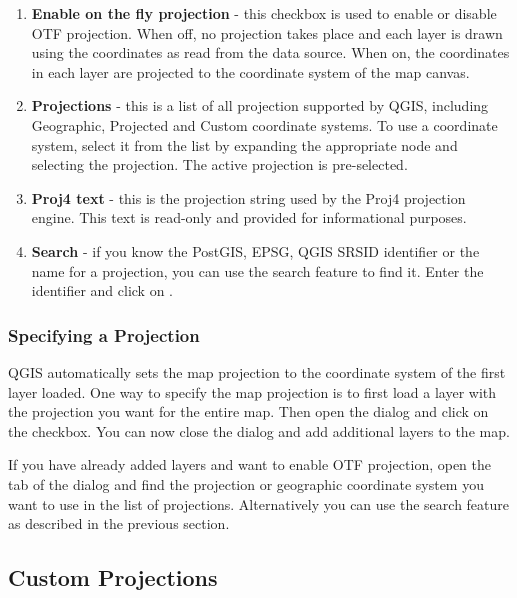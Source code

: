 \begin{enumerate}
\item \textbf{Enable on the fly projection} - this checkbox is used
to enable or disable OTF
projection. When off, no projection takes place and each layer
is drawn using the coordinates as read from the data source. When on, the
coordinates in each layer are projected to the coordinate system of the map
canvas.
\item \textbf{Projections} - this is a list of all projection supported by QGIS,
including Geographic, Projected and Custom coordinate systems. To use a
coordinate system, select it from the list by expanding the appropriate node
and selecting the projection. The active projection is pre-selected.
\item \textbf{Proj4 text} - this is the projection string used by the Proj4 projection
engine. This text is read-only and provided for informational purposes.
\item \textbf{Search} - if you know the PostGIS, EPSG, QGIS SRSID identifier or the name 
for a projection, you can use the search feature to find it. Enter the 
identifier and click on .
\end{enumerate}

\subsubsection{Specifying a Projection}
\label{sec:projection-specifying}

QGIS automatically sets the map projection to the coordinate system of the
first layer loaded. One way to specify the map projection is to first load a
layer with the projection you want for the entire map. Then open the
 dialog and click on the  checkbox. You can now close the  dialog
and add additional layers to the map. 

If you have already added layers and want to enable OTF projection, open the 
 tab of the  dialog and find the projection or geographic
coordinate system you want to use in the list of projections. Alternatively
you can use the search feature as described in the previous section.

\subsection{Custom Projections}\label{sec:customprojections}

